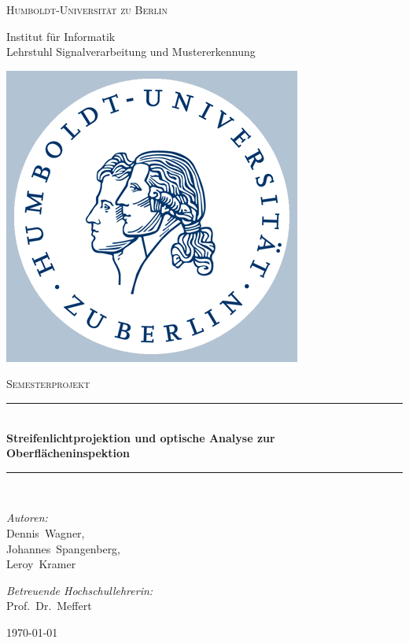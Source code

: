 
\begin{titlepage}
\begin{center}

\begin{minipage}{\textwidth}
	\begin{minipage}[c]{.8\textwidth}
		\textsc{\LARGE Humboldt-Universität zu Berlin}
		
		Institut für Informatik\\
		Lehrstuhl Signalverarbeitung und Mustererkennung
	\end{minipage}\hfill
	\begin{minipage}[c]{.2\textwidth}
		\includegraphics{husiegel}
	\end{minipage}
\end{minipage}
\vspace{1.5cm}

\textsc{\Large Semesterprojekt}\\[0.5cm]

\newcommand{\HRule}{\rule{\linewidth}{0.5mm}}
\HRule \\[0.4cm]
{\huge \bfseries Streifenlichtprojektion und optische Analyse zur Oberflächeninspektion}
\HRule \\[1.5cm]

\begin{minipage}{0.4\textwidth}
\begin{flushleft} \large
\emph{Autoren:}\\
Dennis~Wagner,\\
Johannes~Spangenberg,\\
Leroy~Kramer
\end{flushleft}
\end{minipage}
\hfill
\begin{minipage}{0.4\textwidth}
\begin{flushright} \large
\emph{Betreuende Hochschullehrerin:} \\
Prof.~Dr.~Meffert
\end{flushright}
\end{minipage}

\vfill

{\large \today}

\end{center}
\end{titlepage}
